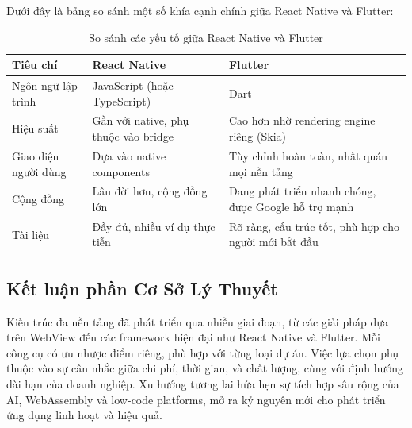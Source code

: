     Dưới đây là bảng so sánh một số khía cạnh chính giữa React Native và Flutter:

    \begin{table}[H]
        \centering
        \begin{tabular}{|l|p{6cm}|p{6cm}|}
            \hline
            \textbf{Tiêu chí} & \textbf{React Native} & \textbf{Flutter} \\
            \hline
            Ngôn ngữ lập trình & JavaScript (hoặc TypeScript) & Dart \\
            \hline
            Hiệu suất & Gần với native, phụ thuộc vào bridge & Cao hơn nhờ rendering engine riêng (Skia) \\
            \hline
            Giao diện người dùng & Dựa vào native components & Tùy chỉnh hoàn toàn, nhất quán mọi nền tảng \\
            \hline
            Cộng đồng & Lâu đời hơn, cộng đồng lớn & Đang phát triển nhanh chóng, được Google hỗ trợ mạnh \\
            \hline
            Tài liệu & Đầy đủ, nhiều ví dụ thực tiễn & Rõ ràng, cấu trúc tốt, phù hợp cho người mới bắt đầu \\
            \hline
        \end{tabular}
        \caption{So sánh các yếu tố giữa React Native và Flutter}
    \end{table}

\subsection{Kết luận phần Cơ Sở Lý Thuyết}
\renewcommand{\labelitemi}{--}    
    
        Kiến trúc đa nền tảng đã phát triển qua nhiều giai đoạn, từ các giải pháp dựa trên WebView đến các framework hiện đại như React Native và Flutter. Mỗi công cụ có ưu nhược điểm riêng, phù hợp với từng loại dự án. Việc lựa chọn phụ thuộc vào sự cân nhắc giữa chi phí, thời gian, và chất lượng, cùng với định hướng dài hạn của doanh nghiệp. Xu hướng tương lai hứa hẹn sự tích hợp sâu rộng của AI, WebAssembly và low-code platforms, mở ra kỷ nguyên mới cho phát triển ứng dụng linh hoạt và hiệu quả.